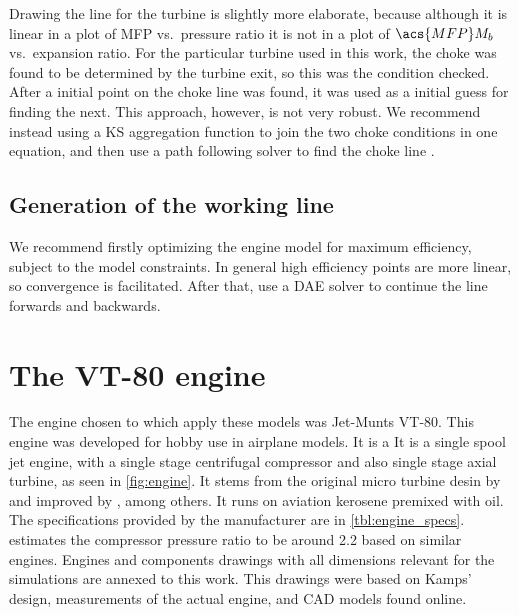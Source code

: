 Drawing the line for the turbine is slightly more elaborate, because although it is linear in a plot of \acs{MFP} vs.\ pressure ratio it is not in a plot of $\acs{MFP}M_b$ vs.\ expansion ratio.
For the particular turbine used in this work, the choke was found to be determined by the turbine exit, so this was the condition checked. After a initial point on the choke line was found, it was used as a initial guess for finding the next. This approach, however, is not very robust. We recommend instead using a KS aggregation function to join the two choke conditions in one equation, and then use a path following solver to find the choke line \cite{martins}.

\subsection{Generation of the working line}
We recommend firstly optimizing the engine model for maximum efficiency, subject to the model constraints. In general high efficiency points are more linear, so convergence is facilitated.
After that, use a \ac{DAE} solver to continue the line forwards and backwards.

\section{The VT-80 engine}
The engine chosen to which apply these models was Jet-Munts VT-80.
This engine was developed for hobby use in airplane models. It is a 
It is a single spool jet engine, with a single stage centrifugal compressor 
 and also single stage axial turbine, as seen in \cref{fig:engine}. It stems from the original micro turbine desin by \textcite{Schreckling1994} and improved by \textcite{Kamps1999}, among others. 
It runs on aviation kerosene premixed with oil.
The specifications provided by the manufacturer are in \cref{tbl:engine_specs}.
\textcite{bolsoni} estimates the compressor pressure ratio 
to be around 2.2 based on similar engines. Engines and components drawings with all dimensions relevant for the simulations are annexed to this work. This drawings were based on Kamps' design, measurements of the actual engine, and CAD models found online.

